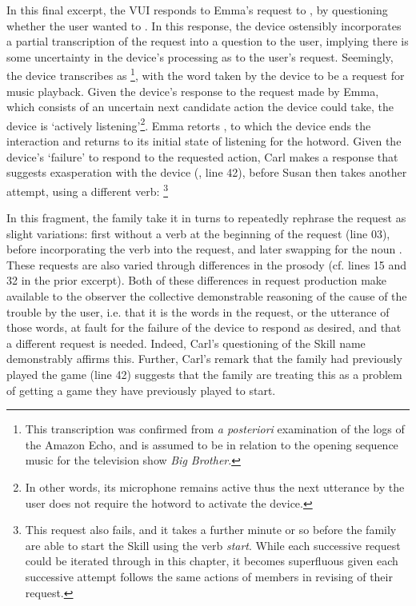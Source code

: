 \begin{revisedsubmission}
In this final excerpt, the \ac{VUI} responds to Emma's request to , by questioning whether the user wanted to .
In this response, the device ostensibly incorporates a partial transcription of the request into a question to the user, implying there is some uncertainty in the device's processing as to the user's request.
Seemingly, the device transcribes  as \footnote{This transcription was confirmed from \textit{a posteriori} examination of the logs of the Amazon Echo, and is assumed to be in relation to the opening sequence music for the television show \textit{Big Brother}.}, with the word  taken by the device to be a request for music playback.
Given the device's response to the request made by Emma, which consists of an uncertain next candidate action the device could take, the device is `actively listening'\footnote{In other words, its microphone remains active thus the next utterance by the user does not require the hotword to activate the device.}.
Emma retorts , to which the device ends the interaction and returns to its initial state of listening for the hotword.
Given the device's `failure' to respond to the requested action, Carl makes a response that suggests exasperation with the device (, line 42), before Susan then takes another attempt, using a different verb: \footnote{This request also fails, and it takes a further minute or so before the family are able to start the Skill using the verb \textit{start}. While each successive request could be iterated through in this chapter, it becomes superfluous given each successive attempt follows the same actions of members in revising of their request.}

In this fragment, the family take it in turns to repeatedly rephrase the request as slight variations: first without a verb at the beginning of the request (line 03), before incorporating the verb  into the request, and later swapping  for the noun . 
These requests are also varied through differences in the prosody (cf. lines 15 and 32 in the prior excerpt).
Both of these differences in request production make available to the observer the collective demonstrable reasoning of the cause of the trouble by the user, i.e. that it is the words in the request, or the utterance of those words, at fault for the failure of the device to respond as desired, and that a different request is needed.
Indeed, Carl's questioning of the Skill name demonstrably affirms this.
Further, Carl's remark that the family had previously played the game (line 42) suggests that the family are treating this as a problem of getting a game they have previously played to start.


\end{revisedsubmission}
